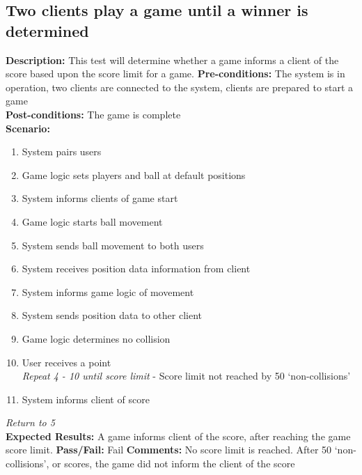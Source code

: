 \documentclass[12pt]{article}
\begin{document}
\subsection{Two clients play a game until a winner is determined}
\textbf{Description:} This test will determine whether a game informs a client of the score based upon the score limit for a game.
\textbf{Pre-conditions:} The system is in operation, two clients are connected to the system, clients are prepared to start a game\\
\textbf{Post-conditions:} The game is complete\\
\textbf{Scenario:}
\begin{enumerate}
\item System pairs users
\item Game logic sets players and ball at default positions
\item System informs clients of game start
\item Game logic starts ball movement
\item System sends ball movement to both users
\item System receives position data information from client
\item System informs game logic of movement
\item System sends position data to other client
\item Game logic determines no collision
\item User receives a point\\
\emph{Repeat 4 - 10 until score limit} - Score limit not reached by 50 ‘non-collisions’
\item System informs client of score
\end{enumerate}
\emph{Return to 5}\\
\textbf{Expected Results:} A game informs client of the score, after reaching the game score limit.
\textbf{Pass/Fail:} Fail
\textbf{Comments:} No score limit is reached. After 50 ‘non-collisions’, or scores, the game did not inform the client of the score
\end{document}
